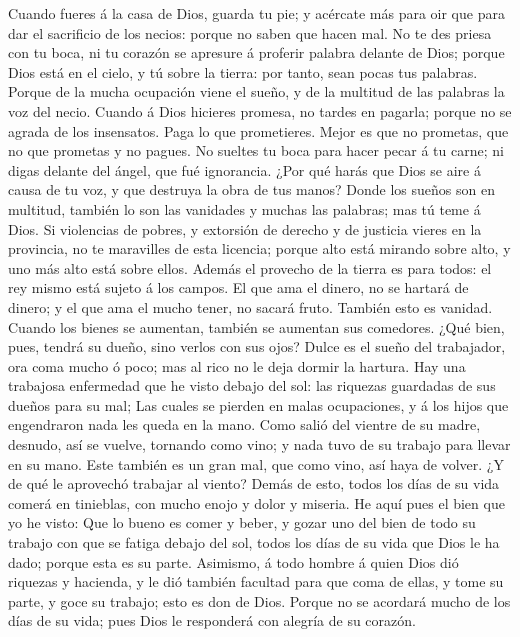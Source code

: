  Cuando fueres á la casa de Dios, guarda tu pie; y acércate
más para oir que para dar el sacrificio de los necios: porque no saben
que hacen mal.  No te des priesa con tu boca, ni tu corazón
se apresure á proferir palabra delante de Dios; porque Dios está en el
cielo, y tú sobre la tierra: por tanto, sean pocas tus palabras.
 Porque de la mucha ocupación viene el sueño, y de la
multitud de las palabras la voz del necio.  Cuando á Dios
hicieres promesa, no tardes en pagarla; porque no se agrada de los
insensatos. Paga lo que prometieres.  Mejor es que no
prometas, que no que prometas y no pagues.  No sueltes tu
boca para hacer pecar á tu carne; ni digas delante del ángel, que fué
ignorancia. ¿Por qué harás que Dios se aire á causa de tu voz, y que
destruya la obra de tus manos?  Donde los sueños son en
multitud, también lo son las vanidades y muchas las palabras; mas tú
teme á Dios.  Si violencias de pobres, y extorsión de
derecho y de justicia vieres en la provincia, no te maravilles de esta
licencia; porque alto está mirando sobre alto, y uno más alto está sobre
ellos.  Además el provecho de la tierra es para todos: el
rey mismo está sujeto á los campos.  El que ama el dinero,
no se hartará de dinero; y el que ama el mucho tener, no sacará fruto.
También esto es vanidad.  Cuando los bienes se aumentan,
también se aumentan sus comedores. ¿Qué bien, pues, tendrá su dueño,
sino verlos con sus ojos?  Dulce es el sueño del
trabajador, ora coma mucho ó poco; mas al rico no le deja dormir la
hartura.  Hay una trabajosa enfermedad que he visto debajo
del sol: las riquezas guardadas de sus dueños para su mal; 
Las cuales se pierden en malas ocupaciones, y á los hijos que
engendraron nada les queda en la mano.  Como salió del
vientre de su madre, desnudo, así se vuelve, tornando como vino; y nada
tuvo de su trabajo para llevar en su mano.  Este también es
un gran mal, que como vino, así haya de volver. ¿Y de qué le aprovechó
trabajar al viento?  Demás de esto, todos los días de su
vida comerá en tinieblas, con mucho enojo y dolor y miseria.
 He aquí pues el bien que yo he visto: Que lo bueno es
comer y beber, y gozar uno del bien de todo su trabajo con que se fatiga
debajo del sol, todos los días de su vida que Dios le ha dado; porque
esta es su parte.  Asimismo, á todo hombre á quien Dios dió
riquezas y hacienda, y le dió también facultad para que coma de ellas, y
tome su parte, y goce su trabajo; esto es don de Dios. 
Porque no se acordará mucho de los días de su vida; pues Dios le
responderá con alegría de su corazón.

